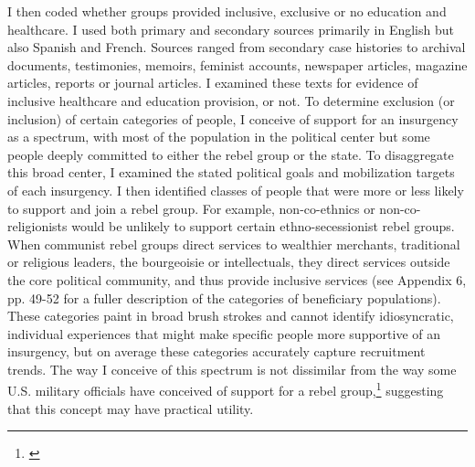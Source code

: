 \documentclass[12pt, letterpaper]{article}
\begin{document}
I then coded whether groups provided inclusive, exclusive or no education and healthcare. I used both primary and secondary sources primarily in English but also Spanish and French. Sources ranged from secondary case histories to archival documents, testimonies, memoirs, feminist accounts, newspaper articles, magazine articles, reports or journal articles. I examined these texts for evidence of inclusive healthcare and education provision, or not. To determine exclusion (or inclusion) of certain categories of people, I conceive of support for an insurgency as a spectrum, with most of the population in the political center but some people deeply committed to either the rebel group or the state. To disaggregate this broad center, I examined the stated political goals and mobilization targets of each insurgency. I then identified classes of people that were more or less likely to support and join a rebel group. For example, non-co-ethnics or non-co-religionists would be unlikely to support certain ethno-secessionist rebel groups. When communist rebel groups direct services to wealthier merchants, traditional or religious leaders, the bourgeoisie or intellectuals, they direct services outside the core political community, and thus provide inclusive services (see Appendix 6, pp. 49-52 for a fuller description of the categories of beneficiary populations). These categories paint in broad brush strokes and cannot identify idiosyncratic, individual experiences that might make specific people more supportive of an insurgency, but on average these categories accurately capture recruitment trends. The way I conceive of this spectrum is not dissimilar from the way some U.S. military officials have conceived of support for a rebel group,\footnote{\citealt{packwood2009popular}} suggesting that this concept may have practical utility.%
\end{document}
